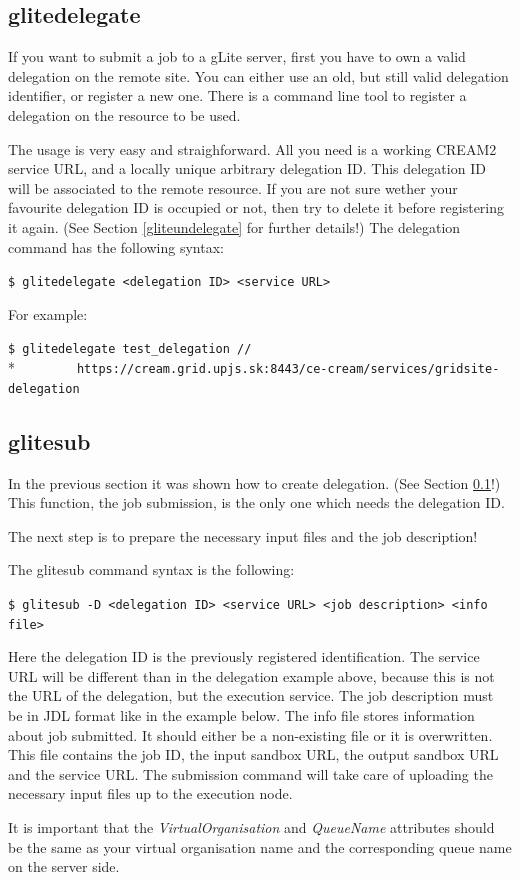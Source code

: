 \documentclass{article}
\begin{document}
\subsection{glitedelegate}
\label{glitedelegate}
If you want to submit a job to a gLite server, first you have to own a valid delegation on the remote site. You can either use an old, but still valid delegation identifier, or register a new one. There is a command line tool to register a delegation on the resource to be used.\par
The usage is very easy and straighforward. All you need is a working CREAM2 service URL, and a locally unique arbitrary delegation ID. This delegation ID will be associated to the remote resource. If you are not sure wether your favourite delegation ID is occupied or not, then try to delete it before registering it again. (See Section \ref{gliteundelegate} for further details!) The delegation command has the following syntax:
\begin{shaded}\verb#$ glitedelegate <delegation ID> <service URL>#\end{shaded}
For example:
\begin{shaded}\verb#$ glitedelegate test_delegation //#\\*
\verb#        https://cream.grid.upjs.sk:8443/ce-cream/services/gridsite-delegation#\end{shaded}
\subsection{glitesub}
\label{glitesub}
In the previous section it was shown how to create delegation. (See Section \ref{glitedelegate}!) This function, the job submission, is the only one which needs the delegation ID.\par The next step is to prepare the necessary input files and the job description!\par
The glitesub command syntax is the following:
\begin{shaded}\verb#$ glitesub -D <delegation ID> <service URL> <job description> <info file>#\end{shaded}
Here the delegation ID is the previously registered identification. The service URL will be different than in the delegation example above, because this is not the URL of the delegation, but the execution service. The job description must be in JDL format like in the example below. The info file stores information about job submitted. It should either be a non-existing file or it is overwritten. This file contains the job ID, the input sandbox URL, the output sandbox URL and the service URL. The submission command will take care of uploading the necessary input files up to the execution node.\par
It is important that the \textit{VirtualOrganisation} and \textit{QueueName} attributes should be the same as your virtual organisation name and the corresponding queue name on the server side.\par
\end{document}
